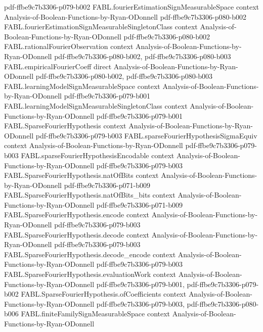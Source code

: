 \begin{theorem}
{    pdf-ffbe9c7b3306-p079-b002}
\proofstep
  {FABL.fourierEstimationSignMeasurableSpace}
  {context}
  {Analysis-of-Boolean-Functions-by-Ryan-ODonnell}
  {pdf-ffbe9c7b3306-p080-b002}
\proofstep
  {FABL.fourierEstimationSignMeasurableSingletonClass}
  {context}
  {Analysis-of-Boolean-Functions-by-Ryan-ODonnell}
  {pdf-ffbe9c7b3306-p080-b002}
\proofstep
  {FABL.rationalFourierObservation}
  {context}
  {Analysis-of-Boolean-Functions-by-Ryan-ODonnell}
  {pdf-ffbe9c7b3306-p080-b002,
    pdf-ffbe9c7b3306-p080-b003}
\proofstep
  {FABL.empiricalFourierCoeff}
  {direct}
  {Analysis-of-Boolean-Functions-by-Ryan-ODonnell}
  {pdf-ffbe9c7b3306-p080-b002,
    pdf-ffbe9c7b3306-p080-b003}
\proofstep
  {FABL.learningModelSignMeasurableSpace}
  {context}
  {Analysis-of-Boolean-Functions-by-Ryan-ODonnell}
  {pdf-ffbe9c7b3306-p079-b001}
\proofstep
  {FABL.learningModelSignMeasurableSingletonClass}
  {context}
  {Analysis-of-Boolean-Functions-by-Ryan-ODonnell}
  {pdf-ffbe9c7b3306-p079-b001}
\proofstep
  {FABL.SparseFourierHypothesis}
  {context}
  {Analysis-of-Boolean-Functions-by-Ryan-ODonnell}
  {pdf-ffbe9c7b3306-p079-b003}
\proofstep
  {FABL.sparseFourierHypothesisSigmaEquiv}
  {context}
  {Analysis-of-Boolean-Functions-by-Ryan-ODonnell}
  {pdf-ffbe9c7b3306-p079-b003}
\proofstep
  {FABL.sparseFourierHypothesisEncodable}
  {context}
  {Analysis-of-Boolean-Functions-by-Ryan-ODonnell}
  {pdf-ffbe9c7b3306-p079-b003}
\proofstep
  {FABL.SparseFourierHypothesis.natOfBits}
  {context}
  {Analysis-of-Boolean-Functions-by-Ryan-ODonnell}
  {pdf-ffbe9c7b3306-p071-b009}
\proofstep
  {FABL.SparseFourierHypothesis.natOfBits_bits}
  {context}
  {Analysis-of-Boolean-Functions-by-Ryan-ODonnell}
  {pdf-ffbe9c7b3306-p071-b009}
\proofstep
  {FABL.SparseFourierHypothesis.encode}
  {context}
  {Analysis-of-Boolean-Functions-by-Ryan-ODonnell}
  {pdf-ffbe9c7b3306-p079-b003}
\proofstep
  {FABL.SparseFourierHypothesis.decode}
  {context}
  {Analysis-of-Boolean-Functions-by-Ryan-ODonnell}
  {pdf-ffbe9c7b3306-p079-b003}
\proofstep
  {FABL.SparseFourierHypothesis.decode_encode}
  {context}
  {Analysis-of-Boolean-Functions-by-Ryan-ODonnell}
  {pdf-ffbe9c7b3306-p079-b003}
\proofstep
  {FABL.SparseFourierHypothesis.evaluationWork}
  {context}
  {Analysis-of-Boolean-Functions-by-Ryan-ODonnell}
  {pdf-ffbe9c7b3306-p079-b001,
    pdf-ffbe9c7b3306-p079-b002}
\proofstep
  {FABL.SparseFourierHypothesis.ofCoefficients}
  {context}
  {Analysis-of-Boolean-Functions-by-Ryan-ODonnell}
  {pdf-ffbe9c7b3306-p079-b003,
    pdf-ffbe9c7b3306-p080-b006}
\proofstep
  {FABL.finiteFamilySignMeasurableSpace}
  {context}
  {Analysis-of-Boolean-Functions-by-Ryan-ODonnell}

\end{theorem}

